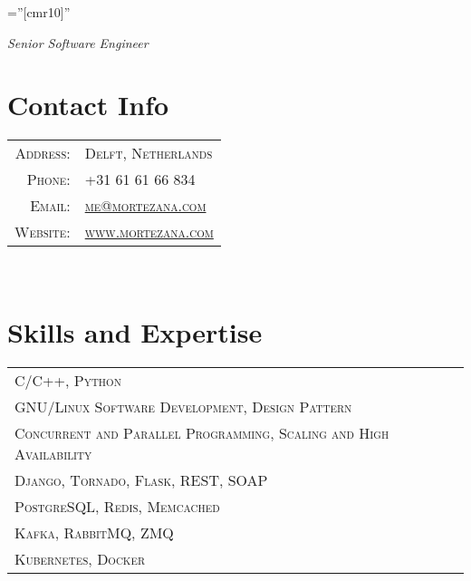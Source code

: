 \documentclass[a4paper,11pt]{article}
\begin{document}
\pagestyle{empty}    %
\font\fb=''[cmr10]'' %

\par {\bigskip \emph{Senior Software Engineer} \par}

\section{Contact Info}
\begin{tabular}{rl}

    \textsc{Address:}     & \textsc{Delft, Netherlands}\\
    \textsc{Phone:}       & \textsc{+31 61 61 66 834}\\
    \textsc{Email:}       & \textsc{\href{mailto:me@mortezana.com}{me@mortezana.com}}\\
    \textsc{Website:}     & \textsc{\href{https://mortezana.com}{www.mortezana.com}}\\

\end{tabular}\\

\section{Skills and Expertise}
\begin{tabular}{lr}

    \textsc{C/C++, Python}\\
    \textsc{GNU/Linux Software Development, Design Pattern}\\
    \textsc{Concurrent and Parallel Programming, Scaling and High Availability}\\
    \textsc{Django, Tornado, Flask, REST, SOAP}\\
    \textsc{PostgreSQL, Redis, Memcached}\\
    \textsc{Kafka, RabbitMQ, ZMQ}\\
    \textsc{Kubernetes, Docker}\\

\end{tabular}\\

\end{document}
